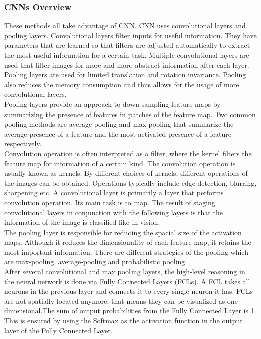         \subsubsection{CNNs Overview}
            These methods all take advantage of CNN. CNN uses convolutional layers and pooling layers. Convolutional layers filter inputs for useful information. They have parameters that are learned so that filters are adjusted automatically to extract the most useful information for a certain task. Multiple convolutional layers are used that filter images for more and more abstract information after each layer. Pooling layers are used for limited translation and rotation invariance. Pooling also reduces the memory consumption and thus allows for the usage of more convolutional layers. \\
            \vspace{3mm}
            Pooling layers provide an approach to down sampling feature maps by summarizing the presence of features in patches of the feature map. Two common pooling methods are average pooling and max pooling that summarize the average presence of a feature and the most activated presence of a feature respectively. \\
            \vspace{3mm}
            Convolution operation is often interpreted as a filter, where the kernel filters the feature map for information of a certain kind. The convolution operation is usually known as kernels. By different choices of kernels, different operations of the images can be obtained. Operations typically include edge detection, blurring, sharpening etc. A convolutional layer is primarily a layer that performs convolution operation. Its main task is to map. The result of staging convolutional layers in conjunction with the following layers is that the information of the image is classified like in vision. \\
            \vspace{3mm}
            The pooling layer is responsible for reducing the spacial size of the activation maps. Although it reduces the dimensionality of each feature map, it retains the most important information. There are different strategies of the pooling which are max-pooling, average-pooling and probabilistic pooling. \\
            \vspace{3mm}
            After several convolutional and max pooling layers, the high-level reasoning in the neural network is done via Fully Connected Layers (FCLs). A FCL takes all neurons in the previous layer and connects it to every single neuron it has. FCLs are not spatially located anymore, that means they can be visualized as one-dimensional.The sum of output probabilities from the Fully Connected Layer is 1. This is ensured by using the Softmax as the activation function in the output layer of the Fully Connected Layer. \\
